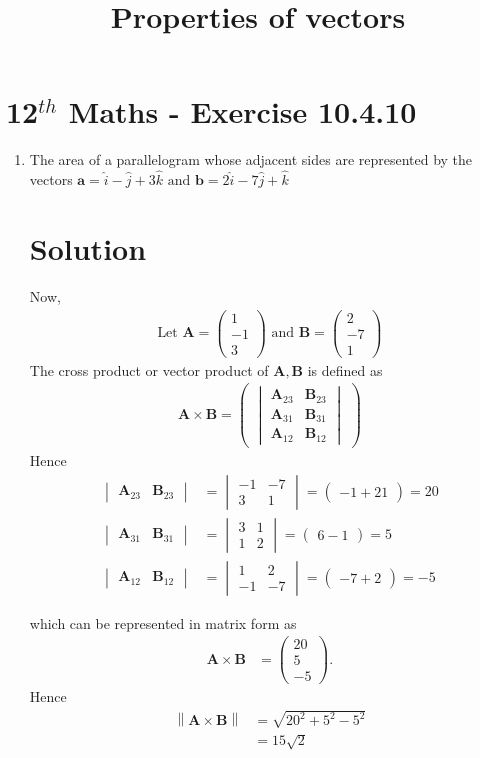 \documentclass[12pt]{article}
\newcommand{\mydet}[1]{\ensuremath{\begin{vmatrix}#1\end{vmatrix}}}
\providecommand{\norm}[1]{\left\lVert#1\right\rVert}
\newcommand{\myvec}[1]{\ensuremath{\begin{pmatrix}#1\end{pmatrix}}}
\let\vec\mathbf
\begin{document}
\begin{center}
\title{\textbf{Properties of vectors}}
\date{\vspace{-5ex}} %
\maketitle
\end{center}
\setcounter{page}{1}
\section{12$^{th}$ Maths - Exercise 10.4.10}

\begin{enumerate}
\item The area of a parallelogram whose adjacent sides are represented by the vectors $\vec{a}=\hat{i}-\hat{j}+3\hat{k}\text{ and } \vec{b}=2\hat{i}-7\hat{j}+\hat{k}$
\section{Solution}
Now,
\begin{align}
\text{Let } \vec{A} = \myvec{1\\-1\\3} \text{ and } \vec{B} = \myvec{2\\ -7 \\ 1}
\end{align}
The cross product or vector product of $\vec{A},\vec{B}$ is defined as
\begin{align}
	\vec{A} \times \vec{B} = \myvec{\mydet{\vec{A}_{23}&\vec{B}_{23}\\\vec{A}_{31}&\vec{B}_{31}\\\vec{A}_{12}&\vec{B}_{12}}}
\end{align}
Hence
\begin{align}
	\mydet{\vec{A}_{23}&\vec{B}_{23}}&=\mydet{-1&-7\\3&1}=\myvec{-1+21}=20\\
	\mydet{\vec{A}_{31}&\vec{B}_{31}}&=\mydet{3&1\\1&2}=\myvec{6-1}=5\\
	\mydet{\vec{A}_{12}&\vec{B}_{12}}&=\mydet{1&2\\-1&-7}=\myvec{-7+2}=-5
\end{align}

which can be represented in matrix form as
\begin{align}
	\vec{A} \times \vec{B}&=\myvec{20\\5\\-5}.
\end{align}
Hence
\begin{align}
\norm{\vec{A} \times \vec{B}}&=\sqrt{20^2+5^2-5^2}\\
 &= 15\sqrt{2}
\end{align}

\end{enumerate}
\end{document}

